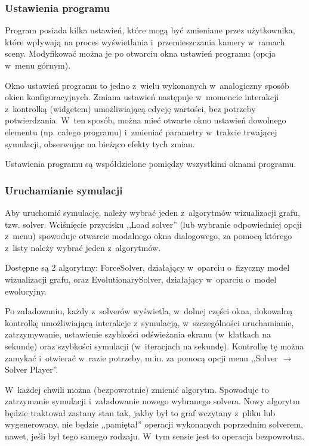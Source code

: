 \documentclass[a4paper,onecolumn,oneside,12pt]{mwart}
\begin{document}
\subsubsection{Ustawienia programu}

Program posiada kilka ustawień, które mogą być zmieniane przez użytkownika,
które wpływają na proces wyświetlania i~przemieszczania kamery w~ramach
sceny. Modyfikować można je po otwarciu okna ustawień programu (opcja
w~menu górnym).

Okno ustawień programu to jedno z~wielu wykonanych w~analogiczny sposób
okien konfiguracyjnych. Zmiana ustawień następuje w~momencie interakcji
z~kontrolką (widgetem) umożliwiającą edycję wartości, bez potrzeby
potwierdzania. W~ten sposób, można mieć otwarte okno ustawień dowolnego
elementu (np. całego programu) i~zmieniać parametry w~trakcie trwającej
symulacji, obserwując na bieżąco efekty tych zmian.

Ustawienia programu są współdzielone pomiędzy wszystkimi oknami programu.

\subsubsection{Uruchamianie symulacji}

Aby uruchomić symulację, należy wybrać jeden z~algorytmów wizualizacji
grafu, tzw. solver. Wciśnięcie przycisku ,,Load solver'' (lub wybranie
odpowiedniej opcji z~menu) spowoduje otwarcie modalnego okna dialogowego,
za pomocą którego z~listy należy wybrać jeden z~algorytmów.

Dostępne są 2 algorytmy: ForceSolver, działający w~oparciu o~fizyczny model
wizualizacji grafu, oraz EvolutionarySolver, działający w~oparciu o~model
ewolucyjny.

Po załadowaniu, każdy z~solverów wyświetla, w~dolnej części okna, dokowalną
kontrolkę umożliwiającą interakcje z~symulacją, w~szczególności
uruchamianie, zatrzymywanie, ustawienie szybkości odświeżania ekranu
(w~klatkach na sekundę) oraz szybkości symulacji (w~iteracjach na sekundę).
Kontrolkę tę można zamykać i~otwierać w~razie potrzeby, m.in. za pomocą
opcji menu ,,Solver $\rightarrow$ Solver Player''.

W~każdej chwili można (bezpowrotnie) zmienić algorytm. Spowoduje to
zatrzymanie symulacji i~załadowanie nowego wybranego solvera. Nowy algorytm
będzie traktował zastany stan tak, jakby był to graf wczytany z~pliku lub
wygenerowany, nie będzie ,,pamiętał'' operacji wykonanych poprzednim
solverem, nawet, jeśli był tego samego rodzaju. W~tym sensie jest to
operacja bezpowrotna.
\end{document}
